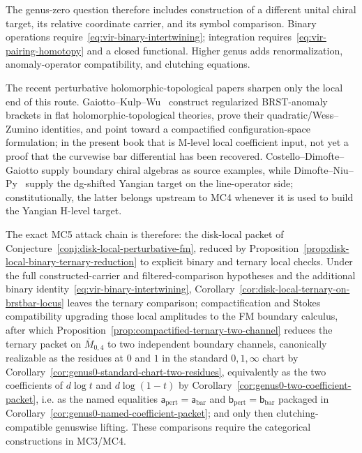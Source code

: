 \begin{remark}
The genus-zero question therefore includes construction of a different unital chiral target, its relative coordinate carrier, and its symbol comparison.
Binary operations require~\eqref{eq:vir-binary-intertwining}; integration requires~\eqref{eq:vir-pairing-homotopy} and a closed functional.
Higher genus adds renormalization, anomaly-operator compatibility, and clutching equations.

The recent perturbative holomorphic-topological papers sharpen only the
local end of this route.  Gaiotto--Kulp--Wu~\cite{GKW24} construct
regularized BRST-anomaly brackets in flat holomorphic-topological
theories, prove their quadratic/Wess--Zumino identities, and point
toward a compactified configuration-space formulation; in the present
book that is M-level local coefficient input, not yet a proof that the
curvewise bar differential has been recovered.  Costello--Dimofte--Gaiotto
\cite{CDG20} supply boundary chiral algebras as source examples, while
Dimofte--Niu--Py~\cite{DNP25} supply the dg-shifted Yangian target on
the line-operator side; constitutionally, the latter belongs upstream to
MC4 whenever it is used to build the Yangian H-level target.

The exact
MC5 attack chain is therefore: the disk-local packet of
Conjecture~\ref{conj:disk-local-perturbative-fm}, reduced by
Proposition~\ref{prop:disk-local-binary-ternary-reduction} to explicit
binary and ternary local checks. Under the full constructed-carrier and filtered-comparison hypotheses and the additional binary identity~\eqref{eq:vir-binary-intertwining}, Corollary~\ref{cor:disk-local-ternary-on-brstbar-locus} leaves the ternary comparison; compactification and
Stokes compatibility upgrading those local amplitudes to the FM
boundary calculus, after which
Proposition~\ref{prop:compactified-ternary-two-channel} reduces the
ternary packet on $\overline{M}_{0,4}$ to two independent boundary
channels, canonically realizable as the residues at $0$ and $1$ in the
standard $0,1,\infty$ chart by
Corollary~\ref{cor:genus0-standard-chart-two-residues}, equivalently as
the two coefficients of
$d\log t$ and $d\log(1-t)$ by
Corollary~\ref{cor:genus0-two-coefficient-packet}, i.e. as the named
equalities
\(\mathsf{a}_{\mathrm{pert}}=\mathsf{a}_{\mathrm{bar}}\) and
\(\mathsf{b}_{\mathrm{pert}}=\mathsf{b}_{\mathrm{bar}}\) packaged in
Corollary~\ref{cor:genus0-named-coefficient-packet};
and only then clutching-compatible genuswise lifting.
These comparisons require the categorical constructions in MC3/MC4.
\end{remark}

